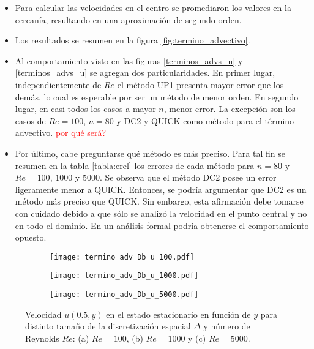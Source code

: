 \documentclass[aps,prb,twocolumn,superscriptaddress,floatfix,longbibliography,10pt]{revtex4-2}
\newcounter{para}
\begin{document}
\begin{itemize}
  \item Para calcular las velocidades en el centro se promediaron los valores en la cercanía, resultando en una aproximación de segundo orden.
  \item Los resultados se resumen en la figura \ref{fig:termino_advectivo}.
  \item Al comportamiento visto en las figuras \ref{terminos_advs_u} y \ref{terminos_advs_u} se agregan dos particularidades. En primer lugar, independientemente de $Re$ el método UP1 presenta mayor error que los demás, lo cual es esperable por ser un método de menor orden. En segundo lugar, en casi todos los casos a mayor $n$, menor error. La excepción son los casos de $Re = 100$, $n = 80$ y DC2 y QUICK como método para el término advectivo. \textcolor{red}{por qué será?}

  \item Por último, cabe preguntarse qué método es más preciso. Para tal fin se resumen en la tabla \ref{tabla:erel} los errores de cada método para $n = 80$ y $Re = 100$, $1000$ y $5000$. Se observa que el método DC2 posee un error ligeramente menor a QUICK. Entonces, se podría argumentar que DC2 es un método más preciso que QUICK. Sin embargo, esta afirmación debe tomarse con cuidado debido a que sólo se analizó la velocidad en el punto central y no en todo el dominio. En un análisis formal podría obtenerse el comportamiento opuesto.
\end{itemize}






\begin{figure}
  \centering
  \begin{subfigure}[b]{0.32\textwidth}
      \centering
      \texttt{[image: termino\_adv\_Db\_u\_100.pdf]}
      \caption{}
      \label{fig:termino_adv_Db_u_100}
  \end{subfigure}
  \hfill
  \begin{subfigure}[b]{0.32\textwidth}
      \centering
      \texttt{[image: termino\_adv\_Db\_u\_1000.pdf]}
      \caption{}
      \label{fig:termino_adv_Db_u_1000}
  \end{subfigure}
  \hfill
  \begin{subfigure}[b]{0.32\textwidth}
      \centering
      \texttt{[image: termino\_adv\_Db\_u\_5000.pdf]}
      \caption{}
      \label{fig:termino_adv_Db_u_5000}
  \end{subfigure}
     \caption{Velocidad $u(0.5,y)$ en el estado estacionario en función de $y$ para distinto tamaño de la discretización espacial $\Delta$ y número de Reynolds $Re$: (a) $Re = 100$, (b) $Re = 1000$ y (c) $Re = 5000$.}
     \label{fig:velocidades_u_DC2_vs_Re}
\end{figure}
\end{document}
